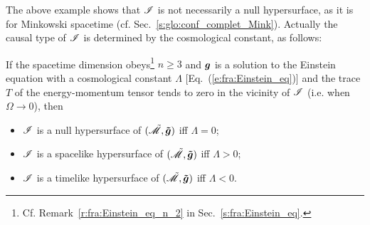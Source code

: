 The above example shows that $\mathscr{I}$ is not necessarily a null hypersurface,
as it is for Minkowski spacetime (cf. Sec.~\ref{s:glo:conf_complet_Mink}).
Actually the causal type of $\mathscr{I}$ is determined by the cosmological
constant, as follows:
\begin{prop}
\label{p:glo:type_scri_sign_Lambda}
If the spacetime dimension obeys\footnote{Cf. Remark~\ref{r:fra:Einstein_eq_n_2} in
Sec.~\ref{s:fra:Einstein_eq}.}
$n\geq 3$ and $\bm{g}$ is a solution to the Einstein equation with
a cosmological constant $\Lambda$ [Eq.~(\ref{e:fra:Einstein_eq})]
and the trace $T$ of the energy-momentum tensor tends to zero in the
vicinity of $\mathscr{I}$ (i.e. when $\Omega\rightarrow 0$), then
\begin{itemize}
\item $\mathscr{I}$ is a null hypersurface of $(\tilde{\mathscr{M}},\bm{\tilde{g}})$ iff $\Lambda=0$;
\item $\mathscr{I}$ is a spacelike hypersurface of $(\tilde{\mathscr{M}},\bm{\tilde{g}})$ iff $\Lambda>0$;
\item $\mathscr{I}$ is a timelike hypersurface of $(\tilde{\mathscr{M}},\bm{\tilde{g}})$ iff $\Lambda<0$.
\end{itemize}
\end{prop}
